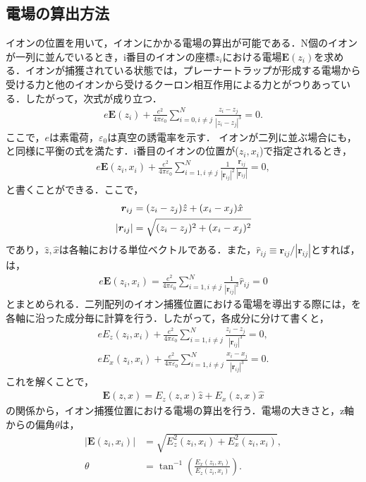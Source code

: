 \subsection{電場の算出方法}
イオンの位置を用いて，イオンにかかる電場の算出が可能である．N個のイオンが一列に並んでいるとき，i番目のイオンの座標$z_{i}$における電場$\bm{E}(z_{i})$を求める．イオンが捕獲されている状態では，プレーナートラップが形成する電場から受ける力と他のイオンから受けるクーロン相互作用による力とがつりあっている．したがって，次式が成り立つ\cite{Brownnutt_2012}．
\large
\begin{align}\label{eq:equi_string}
e\bm{E}(z_i) + \frac{e^2}{4\pi \varepsilon_0} \sum^N_{i=0,i\neq j} \frac{z_i - z_j}{|z_i - z_j|^3} = 0.
\end{align}
\normalsize
ここで，$e$は素電荷，$\varepsilon_0$は真空の誘電率を示す．
イオンが二列に並ぶ場合にも，と同様に平衡の式を満たす．i番目のイオンの位置が($z_i,x_i$)で指定されるとき，
\large
\begin{align}\label{eq:equi_array}
e\bm{E}(z_i,x_i) + \frac{e^2}{4\pi \varepsilon_0}\sum^N_{i=1,i\neq j}\frac{1}{|\bm{r}_{ij}|^2}\frac{\bm{r}_{ij}}{|\bm{r}_{ij}|} = 0,
\end{align}
\normalsize
と書くことができる．ここで，
\large
\begin{align}
\bm{r}_{ij} &= (z_i - z_j)\hat{z} + (x_i - x_j)\hat{x} \notag \\
|\bm{r}_{ij}| &= \sqrt{(z_i - z_j)^2 + (x_i - x_j)^2} \notag 
\end{align}
\normalsize
であり，$\hat{z},\hat{x}$は各軸における単位ベクトルである．また，$\hat{r}_{ij} \equiv \bm{r}_{ij}/|\bm{r}_{ij}|$とすれば，は，
\large
\begin{align}\label{eq:equi_array_2}
e\bm{E}(z_i,x_i) = \frac{e^2}{4\pi \varepsilon_0}\sum^N_{i=1,i\neq j} \frac{1}{|\bm{r}_{ij}|^2}\hat{r}_{ij} = 0
\end{align}
\normalsize
とまとめられる．二列配列のイオン捕獲位置における電場を導出する際には，を各軸に沿った成分毎に計算を行う．したがって，各成分に分けて書くと，
\large
\begin{align}
eE_z(z_i,x_i) + \frac{e^2}{4\pi \varepsilon_0} \sum^N_{i=1,i \neq j}\frac{z_i - z_j}{|\bm{r}_{ij}|^3} = 0 , \\
eE_x(z_i,x_i) + \frac{e^2}{4\pi \varepsilon_0} \sum^N_{i=1,i \neq j}\frac{x_i - x_j}{|\bm{r}_{ij}|^3} = 0 .
\end{align}
\normalsize
これを解くことで，
\large
\begin{align}
\bm{E}(z,x) = E_z(z,x)\hat{z} + E_x(z,x)\hat{x}
\end{align}
\normalsize
の関係から，イオン捕獲位置における電場の算出を行う．電場の大きさと，z軸からの偏角$\theta$は，
\large
\begin{align}
|\bm{E}(z_i,x_i)| &= \sqrt{E_z^2(z_i,x_i) + E_x^2(z_i,x_i)}, \\
\theta &= \tan^{-1} \left(\frac{E_x(z_i,x_i)}{E_z(z_i,x_i)} \right) .
\end{align}
\normalsize